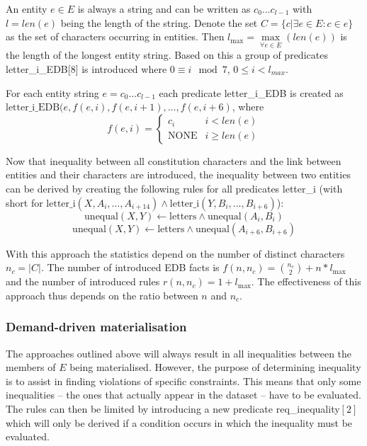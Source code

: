 \documentclass[hyperref,bachelorofscience,fleqn]{cgvpub}
\begin{document}
An entity \(e \in E\) is always a string and can be written as \(c_0 \ldots c_{l - 1}\) with \(l = len(e)\) being the length of the string. Denote the set \(C = \{c | \exists e \in E: c \in e\}\) as the set of characters occurring in entities. Then \(l_{\max} = \max\limits_{\forall e \in E}(len(e))\) is the length of the longest entity string.
Based on this a group of predicates letter\_i\_EDB[8] is introduced where \(0 \equiv i \mod 7\), \(0 \leq i < l_{max} \).

For each entity string \(e = c_0 \ldots c_{l - 1}\) each predicate letter\_i\_EDB is created as \(\text{letter\_i\_EDB}(e, f(e, i), f(e, i+1), \ldots, f(e, i+6)\), where
\begin{equation*}
f(e, i) = 
\begin{cases}
      c_i & i < len(e) \\
      \text{NONE} & i \geq len(e)
\end{cases}
\end{equation*}

Now that inequality between all constitution characters and the link between entities and their characters are introduced, the inequality between two entities can be derived by creating the following rules for all predicates letter\_i (with  short for \(\text{letter\_i}(X, A_i, \ldots, A_{i+14}) \wedge\text{letter\_i}(Y, B_i, \ldots, B_{i+6})\)):
\begin{equation*}
\text{unequal}(X, Y) \leftarrow \text{letters} \wedge \text{unequal}(A_i, B_i)
\end{equation*}
\begin{equation*}
\text{unequal}(X, Y) \leftarrow \text{letters} \wedge \text{unequal}(A_{i+6}, B_{i+6})
\end{equation*}


With this approach the statistics depend on the number of distinct characters \(n_c = |C|\). The number of introduced EDB facts is \(f(n, n_c) = \binom{n_c}{2} + n*l_{\max}\) and the number of introduced rules \(r(n, n_c) = 1 + l_{\max}\). The effectiveness of this approach thus depends on the ratio between \(n\) and \(n_c\).

\subsubsection{Demand-driven materialisation}
The approaches outlined above will always result in all inequalities between the members of \(E\) being materialised. However, the purpose of determining inequality is to assist in finding violations of specific constraints. This means that only some inequalities -- the ones that actually appear in the dataset -- have to be evaluated. The rules can then be limited by introducing a new predicate req\_inequality\([2]\) which will only be derived if a condition occurs in which the inequality must be evaluated.\\
\end{document}
